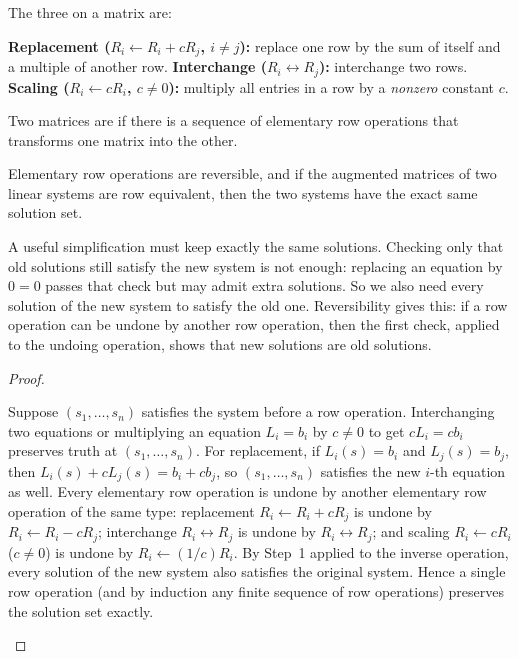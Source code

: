 \documentclass[10pt]{scrartcl}
\begin{document}
\begin{definition*}
  The three  on a matrix are:
  \begin{enumerate}[(1)]
    \ii \textbf{Replacement ($R_i\leftarrow R_i+cR_j$, $i\ne j$):} replace one row by the sum of itself and a multiple of another row.
    \ii \textbf{Interchange ($R_i\leftrightarrow R_j$):} interchange two rows.
    \ii \textbf{Scaling ($R_i\leftarrow cR_i$, $c\ne 0$):} multiply all entries in a row by a \emph{nonzero} constant $c$.
  \end{enumerate}
  Two matrices are  if there is a sequence of elementary row operations that transforms one matrix into the other.
\end{definition*}

\begin{theorem*}
  Elementary row operations are reversible, and if the augmented matrices of two linear systems are row equivalent, then the two systems have the exact same solution set.
\end{theorem*}
\begin{ideabox}
  A useful simplification must keep exactly the same solutions. Checking only that old solutions still satisfy the new system is not enough: replacing an equation by $0=0$ passes that check but may admit extra solutions. So we also need every solution of the new system to satisfy the old one. Reversibility gives this: if a row operation can be undone by another row operation, then the first check, applied to the undoing operation, shows that new solutions are old solutions.
\end{ideabox}
\begin{proof}
  \begin{steps}
    \ii Suppose $(s_1,\dots,s_n)$ satisfies the system before a row operation. Interchanging two equations or multiplying an equation $L_i=b_i$ by $c\ne 0$ to get $cL_i=cb_i$ preserves truth at $(s_1,\dots,s_n)$. For replacement, if $L_i(s)=b_i$ and $L_j(s)=b_j$, then $L_i(s)+cL_j(s)=b_i+cb_j$, so $(s_1,\dots,s_n)$ satisfies the new $i$-th equation as well.
    \ii Every elementary row operation is undone by another elementary row operation of the same type: replacement $R_i\leftarrow R_i+cR_j$ is undone by $R_i\leftarrow R_i-cR_j$; interchange $R_i\leftrightarrow R_j$ is undone by $R_i\leftrightarrow R_j$; and scaling $R_i\leftarrow cR_i$ ($c\ne 0$) is undone by $R_i\leftarrow (1/c)R_i$.
    \ii By Step~1 applied to the inverse operation, every solution of the new system also satisfies the original system. Hence a single row operation (and by induction any finite sequence of row operations) preserves the solution set exactly.
  \end{steps}
\end{proof}
\end{document}
